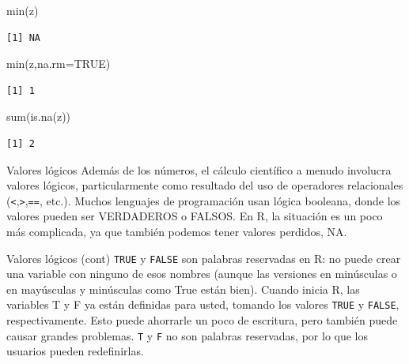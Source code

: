 \documentclass[
  ignorenonframetext,
  aspectratio=169,
  spanish,
]{beamer}
\newenvironment{Shaded}{\begin{snugshade}}{\end{snugshade}}
\newcommand{\AttributeTok}[1]{\textcolor[rgb]{0.40,0.45,0.13}{#1}}
\newcommand{\ConstantTok}[1]{\textcolor[rgb]{0.56,0.35,0.01}{#1}}
\newcommand{\FunctionTok}[1]{\textcolor[rgb]{0.28,0.35,0.67}{#1}}
\newcommand{\NormalTok}[1]{\textcolor[rgb]{0.00,0.23,0.31}{#1}}
\begin{document}
\begin{frame}[fragile]{}
\label{section-10}
\begin{Shaded}
\begin{Highlighting}[]
\FunctionTok{min}\NormalTok{(z)}
\end{Highlighting}
\end{Shaded}

\begin{verbatim}
[1] NA
\end{verbatim}

\begin{Shaded}
\begin{Highlighting}[]
\FunctionTok{min}\NormalTok{(z,}\AttributeTok{na.rm=}\ConstantTok{TRUE}\NormalTok{) }
\end{Highlighting}
\end{Shaded}

\begin{verbatim}
[1] 1
\end{verbatim}

\begin{Shaded}
\begin{Highlighting}[]
\FunctionTok{sum}\NormalTok{(}\FunctionTok{is.na}\NormalTok{(z))}
\end{Highlighting}
\end{Shaded}

\begin{verbatim}
[1] 2
\end{verbatim}
\end{frame}

\begin{frame}[fragile]{Valores lógicos}
\label{valores-luxf3gicos}
Además de los números, el cálculo científico a menudo involucra valores
lógicos, particularmente como resultado del uso de operadores
relacionales (\texttt{\textless{}},\texttt{\textgreater{}},\texttt{==},
etc.). Muchos lenguajes de programación usan lógica booleana, donde los
valores pueden ser VERDADEROS o FALSOS. En R, la situación es un poco
más complicada, ya que también podemos tener valores perdidos, NA.
\end{frame}

\begin{frame}[fragile]{Valores lógicos (cont)}
\label{valores-luxf3gicos-cont}
\texttt{TRUE} y \texttt{FALSE} son palabras reservadas en R: no puede
crear una variable con ninguno de esos nombres (aunque las versiones en
minúsculas o en mayúsculas y minúsculas como True están bien). Cuando
inicia R, las variables T y F ya están definidas para usted, tomando los
valores \texttt{TRUE} y \texttt{FALSE}, respectivamente. Esto puede
ahorrarle un poco de escritura, pero también puede causar grandes
problemas. \texttt{T} y \texttt{F} no son palabras reservadas, por lo
que los usuarios pueden redefinirlas.
\end{frame}
\end{document}
